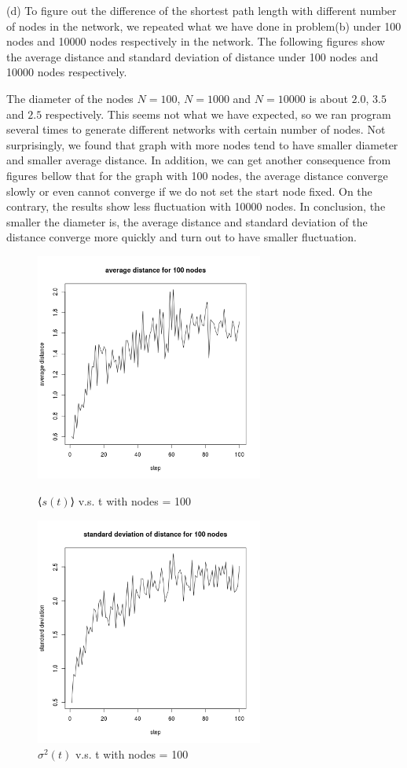 \documentclass[draftcls,12pt,onecolumn]{IEEEtran}
\begin{document}
(d) To figure out the difference of the shortest path length with different number of nodes in the network, we repeated what we have done in problem(b) under 100 nodes and 10000 nodes respectively in the network. The following figures show the average distance and standard deviation of distance under 100 nodes and 10000 nodes respectively.

The diameter of the nodes $N = 100$, $N = 1000$ and $N = 10000$ is about $2.0$, $3.5$ and $2.5$ respectively. This seems not what we have expected, so we ran program several times to generate different networks with certain number of nodes. Not surprisingly, we found that graph with more nodes tend to have smaller diameter and smaller average distance. In addition, we can get another consequence from figures bellow that for the graph with 100 nodes, the average distance converge slowly or even cannot converge if we do not set the start node fixed. On the contrary, the results show less fluctuation with 10000 nodes. In conclusion, the smaller the diameter is, the average distance and standard deviation of the distance converge more quickly and turn out to have smaller fluctuation. 
\begin{figure}[htbp]
\centering
\begin{minipage}[t]{0.48\textwidth}
\centering
\includegraphics[width=7.5cm]{2_1_d_100_distance.png}
\caption{⟨$s(t)$⟩ v.s. t with nodes = 100}
\label{fig05}
\end{minipage}
\begin{minipage}[t]{0.48\textwidth}
\centering
\includegraphics[width=7.5cm]{2_1_d_100_deviation.png}
\caption{$\sigma^2(t)$ v.s. t with nodes = 100}
\label{fig06}
\end{minipage}
\end{figure}
\end{document}
